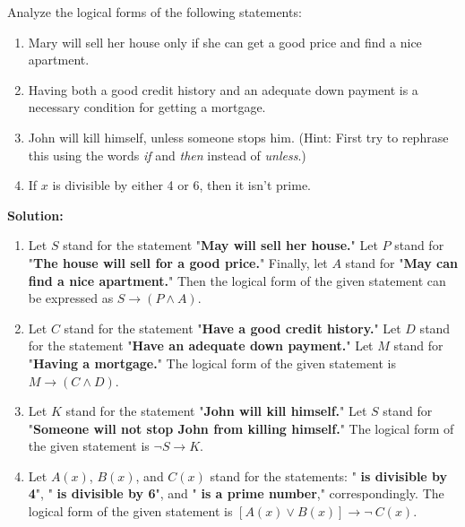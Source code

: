 Analyze the logical forms of the following statements:
\begin{enumerate}[label=(\alph*)]
    \item Mary will sell her house only if she can get a good price and find a nice apartment.
    \item Having both a good credit history and an adequate down payment is a necessary condition for getting a mortgage.
    \item John will kill himself, unless someone stops  him. (Hint: First try to rephrase this using the words \textit{if} and \textit{then} instead of \textit{unless}.)
    \item If $x$ is divisible by either 4 or 6, then it isn't prime.
\end{enumerate}

\textbf{Solution:}
\begin{enumerate}[label=(\alph*)]
    \item Let $S$ stand for the statement "\textbf{May will sell her house.}" Let $P$ stand for "\textbf{The house will sell for a good price.}" Finally, let $A$ stand for "\textbf{May can find a nice apartment.}" Then the logical form of the given statement can be expressed as $S \rightarrow (P \wedge A)$.
    \item Let $C$ stand for the statement "\textbf{Have a good credit history.}" Let $D$ stand for the statement "\textbf{Have an adequate down payment.}" Let $M$ stand for "\textbf{Having a mortgage.}" The logical form of the given statement is $M \rightarrow (C \wedge D)$.
    \item Let $K$ stand for the statement "\textbf{John will kill himself.}" Let $S$ stand for "\textbf{Someone will not stop John from killing himself.}" The logical form of the given statement is $\neg S \rightarrow K$.
    \item Let $A(x)$, $B(x)$, and $C(x)$ stand for the statements: "\textbf{ is divisible by 4}", "\textbf{ is divisible by 6}", and "\textbf{ is a prime number}," correspondingly. The logical form of the given statement is $[A(x) \vee B(x)] \rightarrow \neg \: C(x)$.
\end{enumerate}
\pagebreak